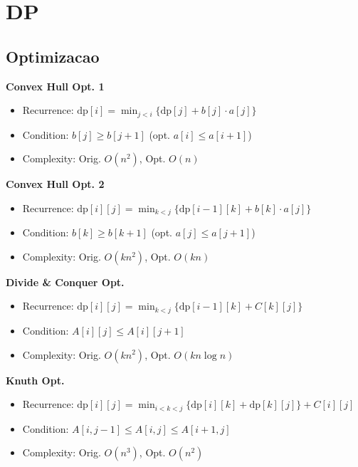 \chapter{DP}

\section{Optimizacao}
\renewcommand{\arraystretch}{1.1}
\setlength{\tabcolsep}{4pt}

\begin{small}
\textbf{Convex Hull Opt. 1}
\begin{itemize}[leftmargin=*]
    \item Recurrence: \(\mathrm{dp}[i] = \min_{j<i} \{\mathrm{dp}[j] + b[j] \cdot a[j]\}\)
    \item Condition: \(b[j] \ge b[j+1]\) (opt. \(a[i] \le a[i+1]\))
    \item Complexity: Orig. \(O(n^2)\), Opt. \(O(n)\)
\end{itemize}

\textbf{Convex Hull Opt. 2}
\begin{itemize}[leftmargin=*]
    \item Recurrence: \(\mathrm{dp}[i][j] = \min_{k<j} \{\mathrm{dp}[i-1][k] + b[k] \cdot a[j]\}\)
    \item Condition: \(b[k] \ge b[k+1]\) (opt. \(a[j] \le a[j+1]\))
    \item Complexity: Orig. \(O(kn^2)\), Opt. \(O(kn)\)
\end{itemize}

\textbf{Divide \& Conquer Opt.}
\begin{itemize}[leftmargin=*]
    \item Recurrence: \(\mathrm{dp}[i][j] = \min_{k<j} \{\mathrm{dp}[i-1][k] + C[k][j]\}\)
    \item Condition: \(A[i][j] \le A[i][j+1]\)
    \item Complexity: Orig. \(O(kn^2)\), Opt. \(O(kn\log n)\)
\end{itemize}

\textbf{Knuth Opt.}
\begin{itemize}[leftmargin=*]
    \item Recurrence: \(\mathrm{dp}[i][j] = \min_{i<k<j} \{\mathrm{dp}[i][k] + \mathrm{dp}[k][j]\} + C[i][j]\)
    \item Condition: \(A[i, j-1] \le A[i, j] \le A[i+1, j]\)
    \item Complexity: Orig. \(O(n^3)\), Opt. \(O(n^2)\)
\end{itemize}
\end{small}


